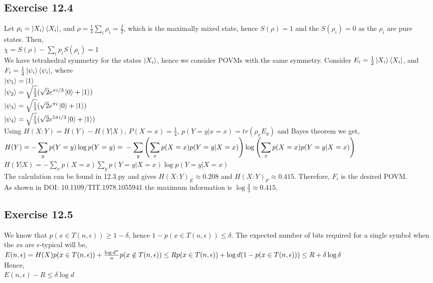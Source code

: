 \documentclass[a4paper,12pt]{article}
\begin{document}
\subsection*{Exercise 12.4}
Let $\rho_i=\ket{X_i}\bra{X_i}$, and  $\rho=\frac{1}{4}\sum_i\rho_i=\frac{I}{2}$, which
is the maximally mixed state, hence $S(\rho)=1$ and the $S(\rho_i)=0$ as the $\rho_i$ are
pure states. Then,\\
$\chi=S(\rho)-\displaystyle\sum_ip_iS(\rho_i)=1$\\
We have tetrahedral symmetry for the states $\ket{X_i}$, hence we consider POVMs with 
the same symmetry. Consider $E_i=\frac{1}{2}\ket{X_i}\bra{X_i}$, and $F_i=\frac{1}{2}\ket{\psi_i}\bra{\psi_i}$,
where\\
$\ket{\psi_1}=\ket{1}$\\
$\ket{\psi_2}=\sqrt{\frac{1}{3}}(\sqrt{2}e^{\pi i/3}\ket{0}+\ket{1})$\\
$\ket{\psi_3}=\sqrt{\frac{1}{3}}(\sqrt{2}e^{\pi i}\ket{0}+\ket{1})$\\
$\ket{\psi_4}=\sqrt{\frac{1}{3}}(\sqrt{2}e^{5\pi i/3}\ket{0}+\ket{1})$\\
Using $H(X:Y)=H(Y)-H(Y|X)$, $P(X=x)=\frac{1}{4}$, $p(Y=y|x=x)=tr(\rho_xE_y)$ and
Bayes theorem we get,\\
$H(Y)=-\displaystyle\sum_yp(Y=y)\log{p(Y=y)}=\\
-\sum_y\left(\sum_xp(X=x)p(Y=y|X=x)\right)\log{\left(\sum_xp(X=x)p(Y=y|X=x)\right)}$\\
$H(Y|X)=\displaystyle - \sum_xp(X=x)\sum_yp(Y=y|X=x)\log{p(Y=y|X=x)}$\\
The calculation can be found in 12.3.py and gives $H(X:Y)_E\approx 0.208$ and
$H(X:Y)_F\approx 0.415$. Therefore, ${F_i}$ is the desired POVM.\\
As shown in DOI: 10.1109/TIT.1978.1055941 the maximum information is $\log{\frac{4}{3}}\approx 0.415$.
\subsection*{Exercise 12.5}
We know that $p(x\in T(n,\epsilon))\geq 1-\delta$, hence $1-p(x\in T(n,\epsilon))\leq\delta$. 
The expected number of bits required for a single symbol when 
the $x$s are $\epsilon$-typical will be,\\
$E(n,\epsilon)=H(X)p(x\in T(n,\epsilon))+\frac{\log{d^n}}{n}p(x\notin T(n,\epsilon))\leq\\
Rp(x\in T(n,\epsilon))+\log{d}(1-p(x\in T(n,\epsilon)))\leq R+\delta\log{\delta}$\\
Hence,\\
$E(n,\epsilon)-R\leq\delta\log{d}$
\end{document}
